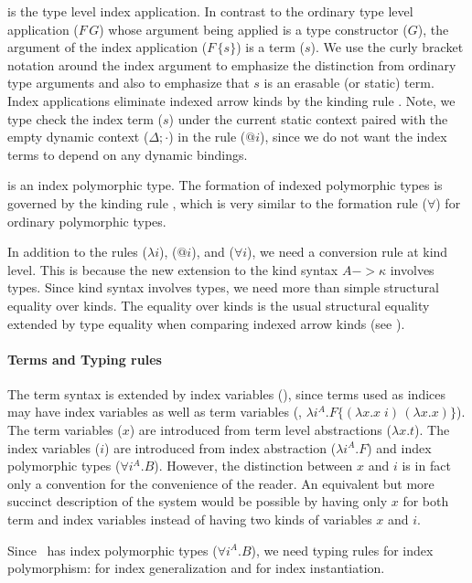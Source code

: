  is the type level index application. In contrast to
the ordinary type level application ($F\,G$) whose argument being applied is
a type constructor ($G$), the argument of the index application ($F\,\{s\}$) is
a term ($s$). We use the curly bracket notation around the index argument to
emphasize the distinction from ordinary type arguments and also to emphasize
that $s$ is an erasable (or static) term. Index applications eliminate
indexed arrow kinds by the kinding rule . Note, we type check
the index term ($s$) under the current static context paired with
the empty dynamic context ($\Delta;\cdot$) in the rule ($@i$), since
we do not want the index terms to depend on any dynamic bindings.

 is an index polymorphic type.
The formation of indexed polymorphic types is governed by
the kinding rule , which is very similar to
the formation rule ($\forall$) for ordinary polymorphic types.

In addition to the rules ($\lambda i$), ($@ i$), and ($\forall i$),
we need a conversion rule  at kind level. This is because
the new extension to the kind syntax $A -> \kappa$ involves types.
Since kind syntax involves types, we need more than simple structural
equality over kinds. The equality over kinds is the usual structural
equality extended by type equality when comparing indexed arrow kinds
(see ).

\paragraph{Terms and Typing rules}
The term syntax is extended by index variables (), since terms used
as indices may have index variables as well as term variables
(\eg, $\lambda i^A.F\{(\lambda x.x\;i)\,(\lambda x.x)\}$).
The term variables ($x$) are introduced from
term level abstractions ($\lambda x.t$).
The index variables ($i$) are introduced from
index abstraction ($\lambda i^A.F$) and
index polymorphic types ($\forall i^A.B$). However, the distinction between
$x$ and $i$ is in fact only a convention for the convenience of the reader.
An equivalent but more succinct description of the system would be possible
by having only $x$ for both term and index variables instead of having two
kinds of variables $x$ and $i$.

Since \Fi\ has index polymorphic types ($\forall i^A . B$),
we need typing rules for index polymorphism:
 for index generalization
and  for index instantiation.

